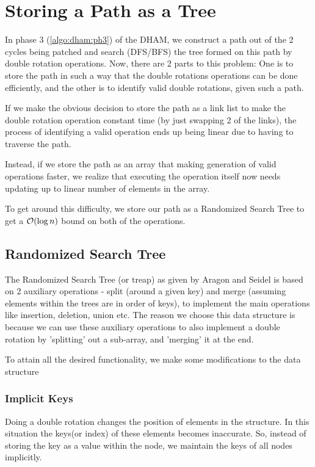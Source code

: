 \chapter{Storing a Path as a Tree}
\label{append:treap}
\vspace*{2em}

In phase 3 (\autoref{algo:dham:ph3}) of the DHAM, we construct a path out of the 2 cycles being patched and search (DFS/BFS) the tree formed on this path by double rotation operations. Now, there are 2 parts to this problem: One is to store the path in such a way that the double rotations operations can be done efficiently, and the other is to identify valid double rotations, given such a path.

If we make the obvious decision to store the path as a link list to make the double rotation operation constant time (by just swapping 2 of the links), the process of identifying a valid operation ends up being linear due to having to traverse the path.

Instead, if we store the path as an array that making generation of valid operations faster, we realize that executing the operation itself now needs updating up to linear number of elements in the array.

To get around this difficulty, we store our path as a Randomized Search Tree \cite{treap} to get a $\mathcal{O}(\log n)$ bound on both of the operations.

\section{Randomized Search Tree}
The Randomized Search Tree (or treap) as given by Aragon and Seidel \cite{treap} is based on 2 auxiliary operations - split (around a given key) and merge (assuming elements within the trees are in order of keys), to implement the main operations like insertion, deletion, union etc. The reason we choose this data structure is because we can use these auxiliary operations to also implement a double rotation by 'splitting' out a sub-array, and 'merging' it at the end.

To attain all the desired functionality, we make some modifications to the data structure

\subsection{Implicit Keys}
Doing a double rotation changes the position of elements in the structure. In this situation the keys(or index) of these elements becomes inaccurate. So, instead of storing the key as a value within the node, we maintain the keys of all nodes implicitly.

